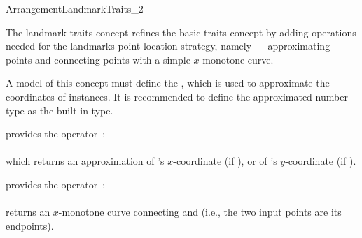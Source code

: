 
\ccRefPageBegin

\begin{ccRefConcept}{ArrangementLandmarkTraits_2}

\ccDefinition

The landmark-traits concept refines the basic traits concept by adding
operations needed for the landmarks point-location strategy, namely ---
approximating points and connecting points with a simple $x$-monotone
curve.

A model of this concept must define the , which
is used to approximate the coordinates of  instances. It is
recommended to define the approximated number type as the built-in
 type. 

\ccRefines
{}

\ccTypes



\ccThreeToTwo

{provides the operator~: \\
  \\
 which returns an approximation of 's $x$-coordinate (if ),
 or of 's $y$-coordinate (if ).}

{provides the operator~: \\
  \\
 returns an $x$-monotone curve connecting  and  (i.e., the
 two input points are its endpoints).}

\ccCreation
{}

\ccThreeToTwo


\end{ccRefConcept}
